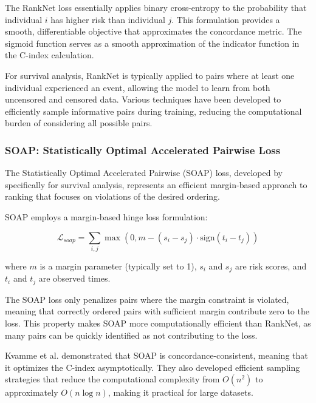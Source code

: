 The RankNet loss essentially applies binary cross-entropy to the probability that individual $i$ has higher risk than individual $j$. This formulation provides a smooth, differentiable objective that approximates the concordance metric. The sigmoid function serves as a smooth approximation of the indicator function in the C-index calculation.

For survival analysis, RankNet is typically applied to pairs where at least one individual experienced an event, allowing the model to learn from both uncensored and censored data. Various techniques have been developed to efficiently sample informative pairs during training, reducing the computational burden of considering all possible pairs.

\subsubsection{SOAP: Statistically Optimal Accelerated Pairwise Loss}

The Statistically Optimal Accelerated Pairwise (SOAP) loss, developed by \textcite{kvamme2019} specifically for survival analysis, represents an efficient margin-based approach to ranking that focuses on violations of the desired ordering.

\begin{definitionbox}[title=SOAP Loss]
  SOAP employs a margin-based hinge loss formulation:

  \begin{equation}
    \mathcal{L}_{soap} = \sum_{i,j} \max(0, m - (s_i - s_j) \cdot \text{sign}(t_i - t_j))
  \end{equation}

  where $m$ is a margin parameter (typically set to 1), $s_i$ and $s_j$ are risk scores, and $t_i$ and $t_j$ are observed times.
\end{definitionbox}

The SOAP loss only penalizes pairs where the margin constraint is violated, meaning that correctly ordered pairs with sufficient margin contribute zero to the loss. This property makes SOAP more computationally efficient than RankNet, as many pairs can be quickly identified as not contributing to the loss.

Kvamme et al. demonstrated that SOAP is concordance-consistent, meaning that it optimizes the C-index asymptotically. They also developed efficient sampling strategies that reduce the computational complexity from $O(n^2)$ to approximately $O(n \log n)$, making it practical for large datasets.

